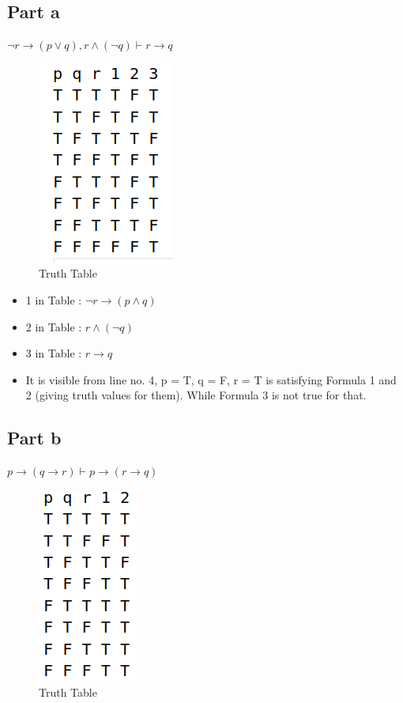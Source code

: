 \documentclass[12pt]{scrartcl}
\begin{document}
\subsection{Part a}
$\neg r \rightarrow (p \vee q),r \wedge (\neg q) \vdash r \rightarrow q$
\begin{figure}[H]
    \centering
    \includegraphics[scale=0.6]{Part1.png}
    \caption{Truth Table}
    \label{fig:enter-label}
\end{figure}
\begin{itemize}
    \item 1 in Table : $\neg r \rightarrow (p \wedge q)$
    \item 2 in Table : $r \wedge (\neg q)$
    \item 3 in Table : $r \rightarrow q$
\end{itemize}
\begin{itemize}
    \item It is visible from line no. 4, p = T, q = F, r = T is satisfying Formula 1 and 2 (giving truth values for them). While Formula 3 is not true for that.
\end{itemize}

\subsection{Part b}
$p \rightarrow (q \rightarrow r) \vdash p \rightarrow (r \rightarrow q)$
\begin{figure}[H]
    \centering
    \includegraphics[scale=0.6]{Part2.png}
    \caption{Truth Table}
    \label{fig:enter-label}
\end{figure}
\end{document}
